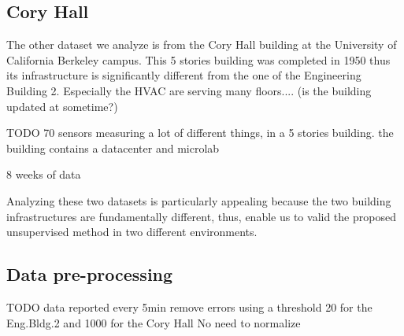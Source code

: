 \subsection{Cory Hall}
The other dataset we analyze is from the Cory Hall building at the University of California Berkeley campus.
This 5 stories building was completed in 1950 thus its infrastructure is significantly different from the one of the Engineering Building 2.
Especially the HVAC are serving many floors.... (is the building updated at sometime?)

TODO
70 sensors measuring a lot of different things, in a 5 stories building. 
the building contains a datacenter and microlab 

8 weeks of data


Analyzing these two datasets is particularly appealing because the two building infrastructures are fundamentally different, thus, enable us to valid the proposed unsupervised method in two different environments.

\subsection{Data pre-processing}
TODO
data reported every 5min 
remove errors using a threshold 20 for the Eng.Bldg.2 and 1000 for the Cory Hall
No need to normalize 

